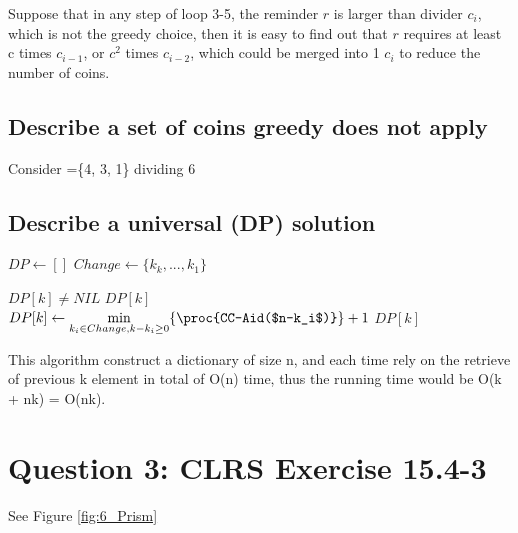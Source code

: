 \documentclass[]{article}
\begin{document}
Suppose that in any step of loop 3-5, the reminder $r$ is larger than divider $c_i$, which is not the greedy choice, then it is easy to find out that $r$ requires at least c times $c_{i-1}$, or $c^2$ times $c_{i-2}$, which could be merged into 1 $c_i$ to reduce the number of coins.

\subsection{Describe a set of coins greedy does not apply}
Consider =\{4, 3, 1\} dividing 6

\subsection{Describe a universal (DP) solution}

\begin{codebox}
	
	\li $DP \leftarrow []$
	\li $Change \leftarrow \{k_k, ..., k_1\}$
	\li \Return {}

\end{codebox}

\begin{codebox}
	
	\li \If $DP[k] \neq NIL$
	\li \Then \Return $DP[k]$
	\li \Else
	\li $DP[k] \leftarrow \underset{k_i \in Change, k-k_i \ge 0 }{\min} \{\proc{CC-Aid($n-k_i$)}\} + 1$
	\li \Return $DP[k]$
	
\end{codebox}

This algorithm construct a dictionary of size n, and each time rely on the retrieve of previous k element in total of O(n) time, thus the running time would be O(k + nk) = O(nk). 

\section{Question 3: CLRS Exercise 15.4-3}

See Figure \ref{fig:6_Prism}
\end{document}
